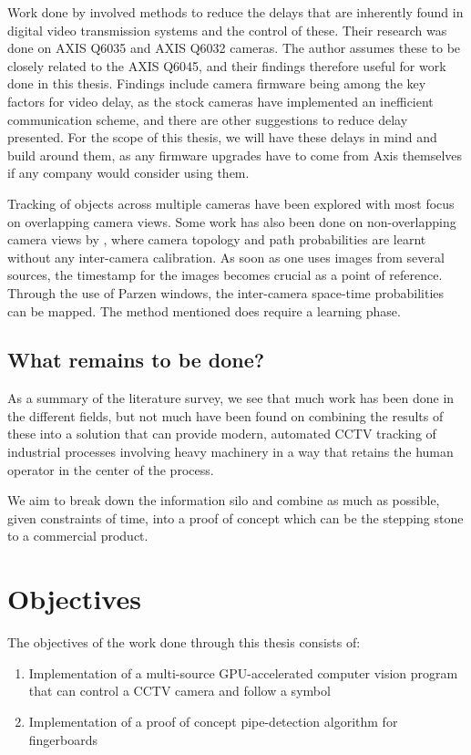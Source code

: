 Work done by \citet{svensson13} involved methods to reduce the delays that are inherently found in digital video transmission systems and the control of these. Their research was done on AXIS Q6035 and AXIS Q6032 cameras. The author assumes these to be closely related to the AXIS Q6045, and their findings therefore useful for work done in this thesis. Findings include camera firmware being among the key factors for video delay, as the stock cameras have implemented an inefficient communication scheme, and there are other suggestions to reduce delay presented. For the scope of this thesis, we will have these delays in mind and build around them, as any firmware upgrades have to come from Axis themselves if any company would consider using them.

Tracking of objects across multiple cameras have been explored with most focus on overlapping camera views. Some work has also been done on non-overlapping camera views by \citet{javed03}, where camera topology and path probabilities are learnt without any inter-camera calibration. As soon as one uses images from several sources, the timestamp for the images becomes crucial as a point of reference. Through the use of Parzen windows, the inter-camera space-time probabilities can be mapped. The method mentioned does require a learning phase.

\subsection{What remains to be done?}
As a summary of the literature survey, we see that much work has been done in the different fields, but not much have been found on combining the results of these into a solution that can provide modern, automated CCTV tracking of industrial processes involving heavy machinery in a way that retains the human operator in the center of the process.

We aim to break down the information silo and combine as much as possible, given constraints of time, into a proof of concept which can be the stepping stone to a commercial product.

\section{Objectives}
The objectives of the work done through this thesis consists of:
\begin{enumerate}
  \item Implementation of a multi-source GPU-accelerated computer vision program that can control a CCTV camera and follow a symbol
  \item Implementation of a proof of concept pipe-detection algorithm for fingerboards
\end{enumerate}


